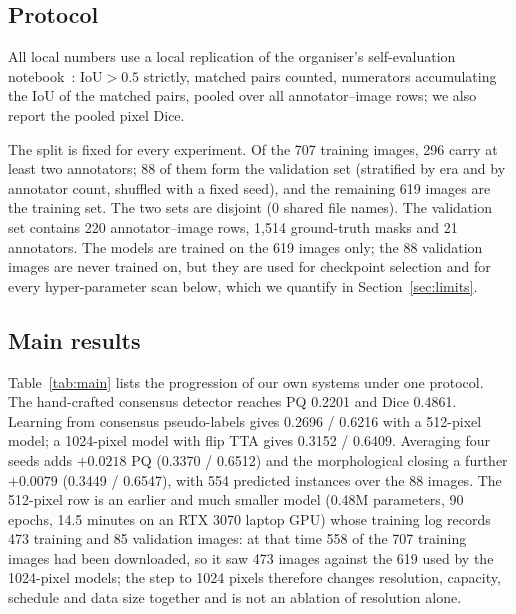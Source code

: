 \documentclass[sigconf]{acmart}
\begin{document}
\subsection{Protocol}
All local numbers use a local replication of the organiser's self-evaluation
notebook~\cite{notebook}: IoU$>0.5$ strictly, matched pairs counted, numerators
accumulating the IoU of the matched pairs, pooled over all
annotator--image rows; we also report the pooled pixel Dice.

The split is fixed for every experiment. Of the 707 training images, 296 carry
at least two annotators; 88 of them form the validation set (stratified by era
and by annotator count, shuffled with a fixed seed), and the remaining 619
images are the training set. The two sets are disjoint (0 shared file names).
The validation set contains 220 annotator--image rows, 1{,}514 ground-truth
masks and 21 annotators. The models are trained on the 619 images only; the 88
validation images are never trained on, but they are used for checkpoint
selection and for every hyper-parameter scan below, which we quantify in
Section~\ref{sec:limits}.

\subsection{Main results}
Table~\ref{tab:main} lists the progression of our own systems under one
protocol. The hand-crafted consensus detector reaches PQ 0.2201 and Dice
0.4861. Learning from consensus pseudo-labels gives 0.2696 / 0.6216 with a
512-pixel model; a 1024-pixel model with flip TTA gives 0.3152 / 0.6409.
Averaging four seeds adds $+0.0218$ PQ (0.3370 / 0.6512) and the
morphological closing a further $+0.0079$ (0.3449 / 0.6547), with 554
predicted instances over the 88 images. The 512-pixel row is an earlier and
much smaller model (0.48M parameters, 90 epochs, 14.5 minutes on an RTX 3070
laptop GPU) whose training log records 473 training and 85 validation images:
at that time 558 of the 707 training images had been downloaded, so it saw
473 images against the 619 used by the 1024-pixel models; the step to 1024
pixels therefore changes resolution, capacity, schedule and data size together
and is not an ablation of resolution alone.
\end{document}
